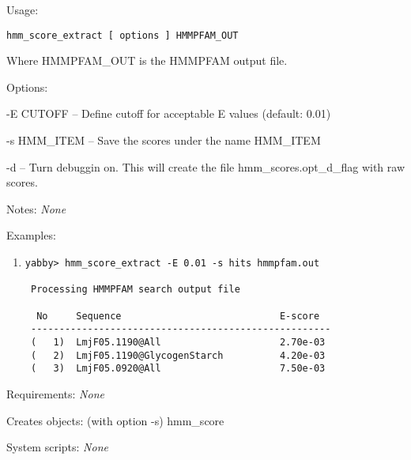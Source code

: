 \begin{description}


\item{Usage:}

{\tt hmm\_score\_extract [ options ] HMMPFAM\_OUT}

Where HMMPFAM\_OUT is the HMMPFAM output file.


\item{Options:}
\begin{description}
\item -E CUTOFF -- Define cutoff for acceptable E values (default: 0.01)
\item -s HMM\_ITEM -- Save the scores under the name HMM\_ITEM
\item -d -- Turn debuggin on. 
            This will create the file hmm\_scores.opt\_d\_flag with raw scores.
\end{description}


\item{Notes:} {\em None}


\item{Examples:}
\begin{enumerate}

\item
\begin{verbatim}
yabby> hmm_score_extract -E 0.01 -s hits hmmpfam.out

 Processing HMMPFAM search output file

  No     Sequence                            E-score
 -----------------------------------------------------
 (   1)  LmjF05.1190@All                     2.70e-03
 (   2)  LmjF05.1190@GlycogenStarch          4.20e-03
 (   3)  LmjF05.0920@All                     7.50e-03

\end{verbatim}

\end{enumerate}


\item{Requirements:} {\em None}


\item{Creates objects:} (with option -s) hmm\_score


\item{System scripts:} {\em None}

\end{description}

